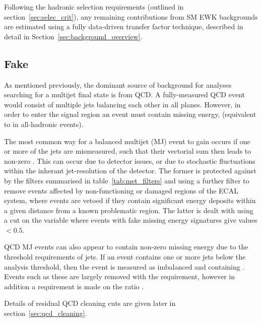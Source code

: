 
Following the hadronic selection requirements (outlined in
section~\ref{sec:selec_crit}),
any remaining contributions from SM EWK backgrounds are estimated using a 
fully data-driven transfer factor technique, described in detail in
Section~\ref{sec:background_overview}.

\subsection{Fake \met}

As mentioned previously, the dominant source of background for analyses 
searching for a multijet final state is from QCD. A fully-measured QCD event 
would consist of multiple jets balancing each other in all planes. However, in 
order to enter the signal region an event must contain missing energy, 
\mht (equivalent to \met in all-hadronic events).

The most common way for a balanced multijet (MJ) event to gain \mht occurs if
one
or more of the jets are mismeasured, such that their vectorial sum then leads to non-zero
\mht. This can occur due to detector issues, or due to stochastic fluctuations
within
the inherant jet-resolution of the 
detector. The former is protected against by the \met filters summarised in 
table~\ref{tab:met_filters} and using a further filter to remove events
affected by non-functioning or damaged regions of the ECAL system, where 
events are vetoed if they contain significant energy deposits within a given 
distance from a known problematic region. The latter is dealt with using a
cut on the \alphat variable where 
events with fake missing energy signatures give values $<0.5$.

QCD MJ events can also appear to contain non-zero missing energy 
due to the threshold requirements of jets. If an event contains 
one or more jets below the analysis threshold, then the 
event is measured as imbalanced and containing \mht. Events such as these are largely 
removed with the \alphat requirement, however in addition a requirement is made on the
ratio \mhtmet.

Details of residual QCD cleaning cuts are given later in
section~\ref{sec:qcd_cleaning}.



